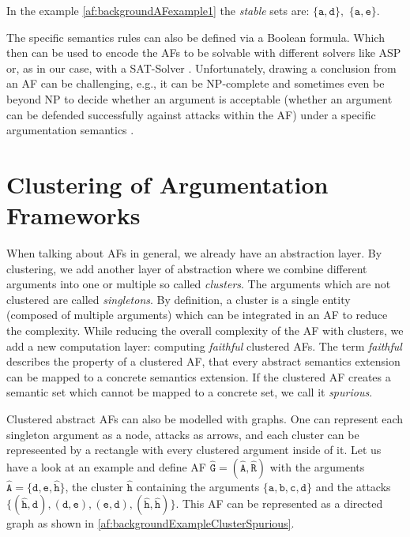 In the example \cref{af:backgroundAFexample1} the \emph{stable} sets are:
$\mathtt{\{a, d\}},$
$\mathtt{\{a, e\}}$.

\vspace{0.5cm}
\noindent
The specific semantics rules can also be defined via a Boolean formula. Which then can be used to encode the AFs to be solvable with different solvers like \ac{ASP} \cite{DBLP:journals/corr/abs-1301-1388} or, as in our case, with a \ac{SAT-Solver} \cite{DBLP:journals/amai/AmgoudD13}. Unfortunately, drawing a conclusion from an AF can be challenging, e.g., it can be NP-complete and sometimes even be beyond NP to decide whether an argument is acceptable (whether an argument can be defended successfully against attacks within the AF) under a specific argumentation semantics \cite{DBLP:journals/ai/DvorakGRW23}.



\section{Clustering of Argumentation Frameworks}
\label{sec:ClusteringOfArgumentationFrameworks}

When talking about AFs in general, we already have an abstraction layer. By clustering, we add another layer of abstraction where we combine different arguments into one or multiple so called \textit{clusters}. The arguments which are not clustered are called \textit{singletons}.
By definition, a cluster is a single entity (composed of multiple arguments) which can be integrated in an AF to reduce the complexity. While reducing the overall complexity of the AF with clusters, we add a new computation layer: computing \textit{faithful} clustered AFs. The term \textit{faithful} describes the property of a clustered AF, that every abstract semantics extension can be mapped to a concrete semantics extension. If the clustered AF creates a semantic set which cannot be mapped to a concrete set, we call it \textit{spurious}.

Clustered abstract AFs can also be modelled with graphs. One can represent each singleton argument as a node, attacks as arrows, and each cluster can be represeented by a rectangle with every clustered argument inside of it. Let us have a look at an example and define AF $\mathtt{\hat{G}=(\hat{A}, \hat{R})}$ with the arguments $\mathtt{\hat{A}=\{d, e, \hat{h}\}}$, the cluster $\mathtt{\hat{h}}$ containing the arguments $\mathtt{\{a, b, c, d\}}$ and the attacks $\mathtt{\{(\hat{h}, d), (d, e), (e, d), (\hat{h}, \hat{h})\}}$.  This AF can be represented as a directed graph as shown in \cref{af:backgroundExampleClusterSpurious}.


